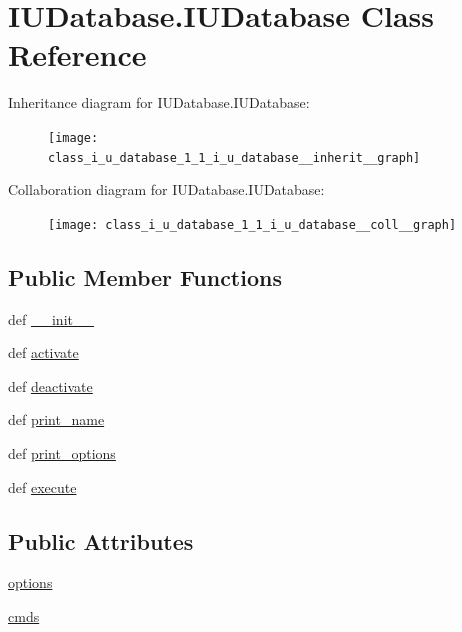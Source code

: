 \hypertarget{class_i_u_database_1_1_i_u_database}{\section{I\-U\-Database.\-I\-U\-Database Class Reference}
\label{class_i_u_database_1_1_i_u_database}
}


Inheritance diagram for I\-U\-Database.\-I\-U\-Database\-:
\nopagebreak
\begin{figure}[H]
\begin{center}
\leavevmode
\texttt{[image: class\_i\_u\_database\_1\_1\_i\_u\_database\_\_inherit\_\_graph]}
\end{center}
\end{figure}


Collaboration diagram for I\-U\-Database.\-I\-U\-Database\-:
\nopagebreak
\begin{figure}[H]
\begin{center}
\leavevmode
\texttt{[image: class\_i\_u\_database\_1\_1\_i\_u\_database\_\_coll\_\_graph]}
\end{center}
\end{figure}
\subsection*{Public Member Functions}
\begin{DoxyCompactItemize}
\item 
def \hyperlink{class_i_u_database_1_1_i_u_database_aa12deecc4a4575f2f203e2bd1b8f0d59}{\-\_\-\-\_\-init\-\_\-\-\_\-}
\item 
def \hyperlink{class_i_u_database_1_1_i_u_database_ab53b555dbca9e121b4e5547f7ec2ecf5}{activate}
\item 
def \hyperlink{class_i_u_database_1_1_i_u_database_a57697e286ce6859233fbf07df5366b30}{deactivate}
\item 
def \hyperlink{class_i_u_database_1_1_i_u_database_a1c5472e3c083eda003ce17d0d40acbe3}{print\-\_\-name}
\item 
def \hyperlink{class_i_u_database_1_1_i_u_database_ac5175b773da96c0c792a262ad444c09c}{print\-\_\-options}
\item 
def \hyperlink{class_i_u_database_1_1_i_u_database_ab26ffba77df100f5b442fafa12e758ec}{execute}
\end{DoxyCompactItemize}
\subsection*{Public Attributes}
\begin{DoxyCompactItemize}
\item 
\hyperlink{class_i_u_database_1_1_i_u_database_a87c602469e1908c2c79859691839e9de}{options}
\item 
\hyperlink{class_i_u_database_1_1_i_u_database_a65d3fd103b54ba61830a606bd2258094}{cmds}
\end{DoxyCompactItemize}
